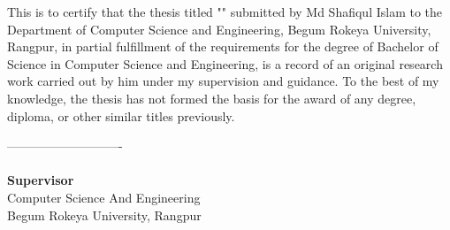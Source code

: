 \newpage
{}

This is to certify that the thesis titled "\textbf{\projectTitle}" submitted by Md Shafiqul Islam to the Department of Computer Science and Engineering, Begum Rokeya University, Rangpur, in partial fulfillment of the requirements for the degree of Bachelor of Science in Computer Science and Engineering, is a record of an original research work carried out by him under my supervision and guidance.
To the best of my knowledge, the thesis has not formed the basis for the award of any degree, diploma, or other similar titles previously.
\vspace{2cm}
\begin{flushright}
    ----------------------------\\
    \textbf{\thesupervisor}\\
    \textbf{Supervisor}\\
    Computer Science And Engineering\\
    Begum Rokeya University, Rangpur\\
\end{flushright}